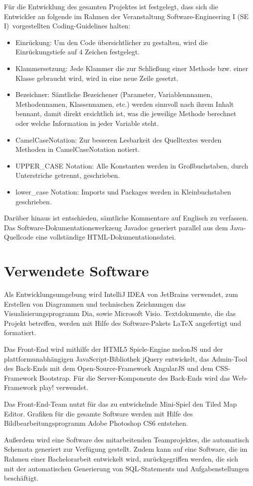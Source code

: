 F\"ur die Entwicklung des gesamten Projektes ist festgelegt, dass sich die Entwickler an folgende im Rahmen der Veranstaltung \glqq Software-Engineering I (SE I)\grqq~vorgestellten Coding-Guidelines halten:
\begin{itemize}
	\item Einr\"uckung: Um den Code \"ubersichtlicher zu gestalten, wird die Einr\"uckungstiefe auf 4 Zeichen festgelegt.
	\item Klammersetzung: Jede Klammer die zur Schlie{\ss}ung einer Methode bzw. einer Klasse gebraucht wird, wird in eine neue Zeile gesetzt. 
	\item Bezeichner: S\"amtliche Bezeichener (Parameter, Variablennnamen, Methodennamen, Klassennamen, etc.) werden sinnvoll nach ihrem Inhalt 		bennant, damit direkt ersichtlich ist, was die jeweilige Methode berechnet oder welche Information in jeder Variable steht.
	\item CamelCaseNotation: Zur besseren Lesbarkeit des Quelltextes werden Methoden in CamelCaseNotation notiert. 
	\item UPPER\_CASE Notation: Alle Konstanten werden in Gro{\ss}buchstaben, durch Unterstriche getrennt, geschrieben.
	\item lower\_case Notation: Imports und Packages werden in Kleinbuchstaben geschrieben.	
\end{itemize} 

Dar\"uber hinaus ist entschieden, s\"amtliche Kommentare auf Englisch zu verfassen.
Das Software-Dokumentationswerkzeug Javadoc generiert parallel aus dem Java-Quellcode eine vollst\"andige HTML-Dokumentationsdatei.



\section{Verwendete Software}

Als Entwicklungsumgebung wird IntelliJ IDEA von JetBrains verwendet, zum Erstellen von Diagrammen und technischen Zeichnungen  das Visualisierungsprogramm Dia, sowie Microsoft Visio. Textdokumente, die das Projekt betreffen, werden mit Hilfe des Software-Pakets LaTeX angefertigt und formatiert.

Das Front-End wird mithilfe der HTML5 Spiele-Engine melonJS und der plattformunabh\"angigen JavaScript-Bibliothek jQuery entwickelt, das Admin-Tool des Back-Ends mit dem Open-Source-Framework AngularJS und dem CSS-Framework Bootstrap.
F\"ur die Server-Komponente des Back-Ends wird das Web-Framework play! verwendet. 

Das Front-End-Team nutzt f\"ur das zu entwickelnde Mini-Spiel den Tiled Map Editor. Grafiken f\"ur die gesamte Software werden mit Hilfe des Bildbearbeitungsprogramm Adobe Photoshop CS6 entstehen.

Au{\ss}erdem wird eine Software des mitarbeitenden Teamprojektes, die automatisch Schemata generiert zur Verf\"ugung gestellt. Zudem kann auf eine Software, die im Rahmen einer Bachelorarbeit entwickelt wird, zur\"uckgegriffen werden, die sich mit der automatischen Generierung von SQL-Statements und Aufgabenstellungen besch\"aftigt.



